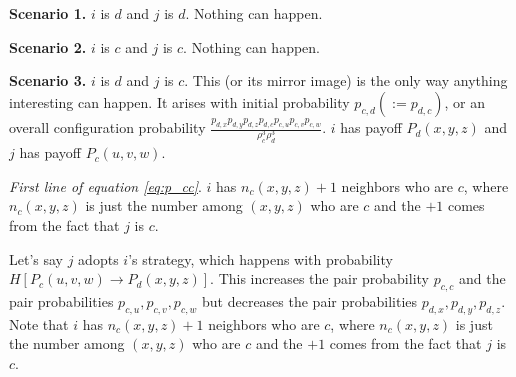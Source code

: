 \documentclass[13pt]{amsart}
\begin{document}
\textbf{Scenario 1.}
$i$ is $d$ and $j$ is $d$.
Nothing can happen.

\textbf{Scenario 2.}
$i$ is $c$ and $j$ is $c$.
Nothing can happen.

\textbf{Scenario 3.}
$i$ is $d$ and $j$ is $c$.
This (or its mirror image) is the only way anything interesting can happen.
It arises with initial probability $p_{c,d} (:= p_{d,c})$, or an overall configuration probability $\frac{p_{d,x}p_{d,y}p_{d,z} p_{d,c} p_{c,u} p_{c,v} p_{c,w}}{\rho_c^3 \rho_d^3}$.
$i$ has payoff $P_d(x, y, z)$ and $j$ has payoff $P_c(u, v, w)$.

\emph{First line of equation \ref{eq:p_cc}}.
$i$ has $n_c(x, y, z) + 1$ neighbors who are $c$, where $n_c(x,y,z)$ is just the number among $(x, y, z)$ who are $c$ and the $+1$ comes from the fact that $j$ is $c$.

Let's say $j$ adopts $i$'s strategy, which happens with probability $H\left[P_c(u,v,w) \to P_d(x,y,z) \right]$.
This increases the pair probability $p_{c,c}$ and the pair probabilities $p_{c,u}, p_{c,v}, p_{c,w}$ but decreases the pair probabilities $p_{d,x}, p_{d,y}, p_{d,z}$.
Note that $i$ has $n_c(x, y, z) + 1$ neighbors who are $c$, where $n_c(x,y,z)$ is just the number among $(x, y, z)$ who are $c$ and the $+1$ comes from the fact that $j$ is $c$.
\end{document}
